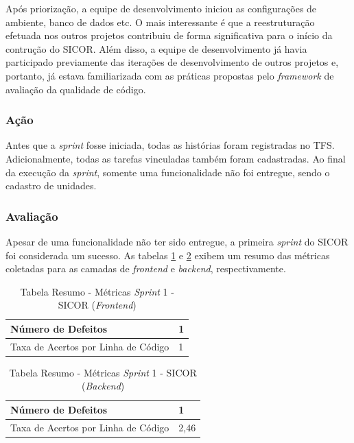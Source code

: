 Após priorização, a equipe de desenvolvimento iniciou as configurações de ambiente, banco de dados etc. O mais interessante é que a reestruturação efetuada nos outros projetos contribuiu de forma significativa para o início da contrução do SICOR. Além disso, a equipe de desenvolvimento já havia participado previamente das iterações de desenvolvimento de outros projetos e, portanto, já estava familiarizada com as práticas propostas pelo \textit{framework} de avaliação da qualidade de código.

\subsubsection{Ação}

Antes que a \textit{sprint} fosse iniciada, todas as histórias foram registradas no TFS. Adicionalmente, todas as tarefas vinculadas também foram cadastradas. Ao final da execução da \textit{sprint}, somente uma funcionalidade não foi entregue, sendo o cadastro de unidades.

\subsubsection{Avaliação}

Apesar de uma funcionalidade não ter sido entregue, a primeira \textit{sprint} do SICOR foi considerada um sucesso. As tabelas \ref{table:tabela7} e \ref{table:tabela8} exibem um resumo das métricas coletadas para as camadas de \textit{frontend} e \textit{backend}, respectivamente.

\begin{table}[h]
\caption{Tabela Resumo - Métricas \textit{Sprint} 1 - SICOR (\textit{Frontend})}
\centering
\begin{tabular}{ | m{8cm} | m{8cm} | } 
\hline
Número de Defeitos & 1 \\ 
\hline
Taxa de Acertos por Linha de Código & 1 \\ 
\hline
\end{tabular}
\label{table:tabela7}
\end{table}

\begin{table}[h]
\caption{Tabela Resumo - Métricas \textit{Sprint} 1 - SICOR (\textit{Backend})}
\centering
\begin{tabular}{ | m{8cm} | m{8cm} | } 
\hline
Número de Defeitos & 1 \\ 
\hline
Taxa de Acertos por Linha de Código & 2,46 \\ 
\hline
\end{tabular}
\label{table:tabela8}
\end{table}

